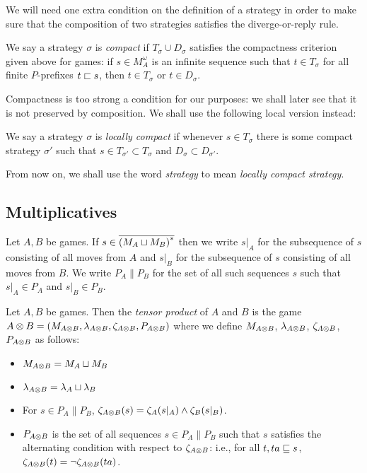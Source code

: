 \documentclass{entcs} \usepackage{prentcsmacro}
\newcommand{\0}{{\mathtt{0}}}
\begin{document}
We will need one extra condition on the definition of a strategy in order to make sure that the composition of two strategies satisfies the diverge-or-reply rule.

\begin{definition}
  We say a strategy $\sigma$ is \emph{compact} if $T_\sigma\cup D_\sigma$ satisfies the compactness criterion given above for games: if $s\in M_A^\omega$ is an infinite sequence such that $t\in T_\sigma$ for all finite $P$-prefixes $t\sqsubset s$, then $t\in T_\sigma$ or $t\in D_\sigma$.  
\end{definition}

Compactness is too strong a condition for our purposes: we shall later see that it is not preserved by composition.  We shall use the following local version instead:

\begin{definition}
  We say a strategy $\sigma$ is \emph{locally compact} if whenever $s\in T_\sigma$ there is some compact strategy $\sigma'$ such that $s\in T_{\sigma'}\subset T_\sigma$ and $D_\sigma\subset D_{\sigma'}$.
\end{definition}

From now on, we shall use the word \emph{strategy} to mean \emph{locally compact strategy}.

\subsection{Multiplicatives}

Let $A,B$ be games.  If $s\in {\overline{{(M_A\sqcup M_B)}^{*}}}$ then we write $s\vert_A$ for the subsequence of $s$ consisting of all moves from $A$ and $s\vert_B$ for the subsequence of $s$ consisting of all moves from $B$.  We write $P_A\|P_B$ for the set of all such sequences $s$ such that $s\vert_A\in P_A$ and $s\vert_B\in P_B$.  

\begin{definition}
  Let $A,B$ be games.  Then the \emph{tensor product} of $A$ and $B$ is the game $A\otimes B=(M_{A\otimes B}, \lambda_{A\otimes B}, \zeta_{A\otimes B}, P_{A\otimes B})$ where we define $M_{A\otimes B}$, $\lambda_{A\otimes B}$, $\zeta_{A\otimes B}$, $P_{A\otimes B}$ as follows:
  \begin{itemize}
    \item $M_{A\otimes B} = M_A \sqcup M_B$
    \item $\lambda_{A\otimes B} = \lambda_A \sqcup \lambda_B$
    \item For $s\in P_A\|P_B$, $\zeta_{A\otimes B}(s) = \zeta_A(s\vert_A) \wedge \zeta_B(s\vert_B)$.
    \item $P_{A\otimes B}$ is the set of all sequences $s\in P_A\|P_B$ such that $s$ satisfies the alternating condition with respect to $\zeta_{A\otimes B}$: i.e., for all $t,ta\sqsubseteq s$, $\zeta_{A\otimes B}(t) = \neg\zeta_{A\otimes B}(ta)$.  
  \end{itemize}
\end{definition}
\end{document}
